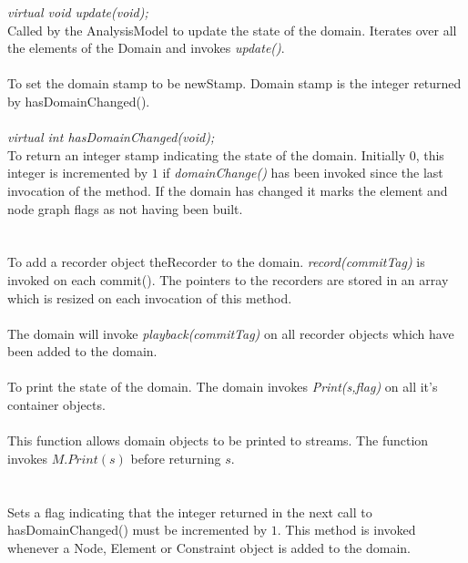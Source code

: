 {{\em virtual void update(void);} \\
Called by the AnalysisModel to update the state of the
domain. Iterates over all the elements of the Domain and invokes {\em
update()}. \\

\\
To set the domain stamp to be \p newStamp. Domain stamp is the
integer returned by hasDomainChanged(). \\

 \\
{\em virtual int hasDomainChanged(void);} \\
To return an integer stamp indicating the state of the
domain. Initially $0$, this integer is incremented by $1$ if  {\em
domainChange()} has been invoked since the last invocation of the
method. If the domain has changed it marks the element and node graph
flags as not having been built.\\  

 \\
\\
To add a recorder object \p theRecorder to the domain. {\em
record(commitTag)} is invoked on each commit(). The pointers to
the recorders are stored in an array which is resized on each
invocation of this method.\\  

\\
The domain will invoke {\em playback(commitTag)} on all recorder
objects which have been added to the domain.\\

\\
To print the state of the domain. The domain invokes {\em Print(s,flag)} on
all it's container objects. \\


\\  
This function allows domain objects to be printed to streams. The
function invokes $M.Print(s)$ before returning $s$. \\

  \\
\\
Sets a flag indicating that the integer returned in the next call to 
hasDomainChanged() must be incremented by $1$. This method is
invoked whenever a Node, Element or Constraint object is added to the
domain. \\ 

}
